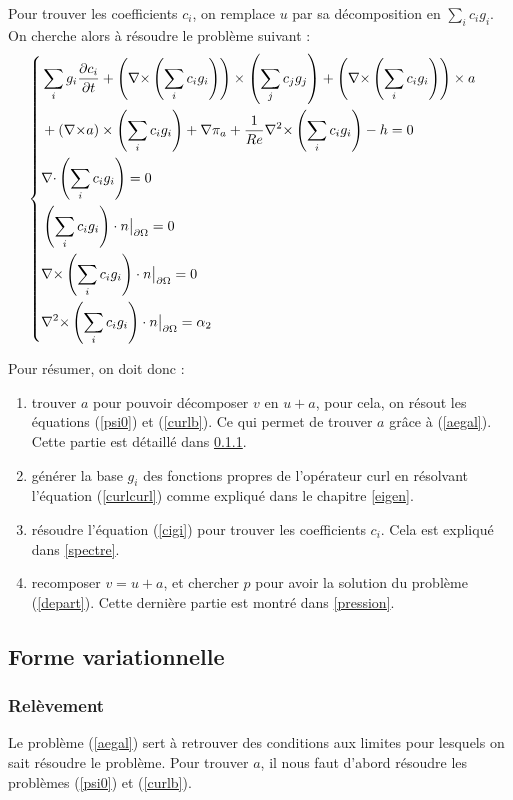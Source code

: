 Pour trouver les coefficients $c_i$, on remplace $u$ par sa décomposition en $\sum_i c_ig_i$. On cherche alors à résoudre le problème suivant :
\begin{eqnarray}
\label{cigi}
\left\{
\begin{aligned}
&\sum_i g_i\frac{\partial c_i}{\partial t} + \left({\nabla\times}\left(\sum_i c_ig_i\right)\right)\times\left(\sum_jc_jg_j\right)+\left({\nabla\times}\left(\sum_ic_ig_i\right)\right)\times a&\\
&+ \left({\nabla\times} a\right)\times\left(\sum_ic_ig_i\right) + {\nabla}\pi_a + \frac{1}{Re}{\nabla^2\times}\left(\sum_ic_ig_i\right) - h = 0\\
&{\nabla\cdot}\left(\sum_ic_ig_i\right) = 0\\
&\left(\sum_ic_ig_i\right)\cdot n{\big\rvert_{\partial\Omega}} = 0\\
&{\nabla\times}\left(\sum_ic_ig_i\right)\cdot n{\big\rvert_{\partial\Omega}} = 0\\
&{\nabla^2\times}\left(\sum_ic_ig_i\right)\cdot n{\big\rvert_{\partial\Omega}} = \alpha_2
\end{aligned}
\right.
\end{eqnarray}

Pour résumer, on doit donc :
\begin{enumerate}
\item trouver $a$ pour pouvoir décomposer $v$ en $u+a$, pour cela, on résout les équations (\ref{psi0}) et (\ref{curlb}). Ce qui permet de trouver $a$ grâce à (\ref{aegal}). Cette partie est détaillé dans \ref{relev}.
\item générer la base $g_i$ des fonctions propres de l'opérateur curl en résolvant l'équation (\ref{curlcurl}) comme expliqué dans le chapitre \ref{eigen}.
\item résoudre l'équation (\ref{cigi}) pour trouver les coefficients $c_i$. Cela est expliqué dans \ref{spectre}.
\item recomposer $v=u+a$, et chercher $p$ pour avoir la solution du problème (\ref{depart}). Cette dernière partie est montré dans \ref{pression}.
\end{enumerate}

\subsection{Forme variationnelle}
\subsubsection{Relèvement}
\label{relev}

Le problème (\ref{aegal}) sert à retrouver des conditions aux limites pour lesquels on sait résoudre le problème. Pour trouver $a$, il nous faut d'abord résoudre les problèmes (\ref{psi0}) et (\ref{curlb}).\\

